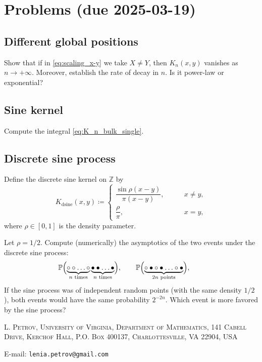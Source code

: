 \documentclass[letterpaper,11pt,oneside,reqno]{article}
\numberwithin{equation}{section}
\theoremstyle{definition}
\begin{document}
\appendix
\setcounter{section}{5}

\section{Problems (due 2025-03-19)}

\subsection{Different global positions}
\label{prob:different-global-positions}

Show that if in \eqref{eq:scaling_x-y} we take $X\ne Y$, then
$K_n(x,y)$ vanishes as $n\to+\infty$. Moreover,
establish the rate of decay in $n$. Is it power-law or exponential?

\subsection{Sine kernel}
\label{prob:sine-kernel}

Compute the integral
\eqref{eq:K_n_bulk_single}.


\subsection{Discrete sine process}
\label{prob:discrete-sine-process}

Define the discrete sine kernel on $\mathbb{Z}$ by
\begin{equation*}
	K_{\mathrm{dsine}}(x,y)\coloneqq
	\begin{cases}
		\dfrac{\sin \rho(x-y)}{\pi (x-y)},&\qquad x\ne y,\\[10pt]
		\dfrac{\rho}{\pi},&\qquad x=y,
	\end{cases}
\end{equation*}
where $\rho\in[0,1]$ is the density parameter.

Let $\rho=1/2$.
Compute (numerically) the asymptotics of the two events under the discrete sine process:
\begin{equation*}
	\operatorname{\mathbb{P}}
	\Bigl(
		\underbrace{\circ \circ\ldots\circ}_{n\text{ times}}
		\underbrace{\bullet \bullet\ldots\bullet}_{n\text{ times}}
	\Bigr),\qquad
	\operatorname{\mathbb{P}}
	\Bigl(
		\underbrace{\circ\bullet\circ\bullet\ldots\circ\bullet}_{2n\text{ points}}
	\Bigr),\qquad
\end{equation*}
If the sine process was of independent random points (with the same density $1/2$),
both events
would have the same probability $2^{-2n}$.
Which event is more favored by the sine process?









\medskip

\textsc{L. Petrov, University of Virginia, Department of Mathematics, 141 Cabell Drive, Kerchof Hall, P.O. Box 400137, Charlottesville, VA 22904, USA}

E-mail: \texttt{lenia.petrov@gmail.com}
\end{document}
